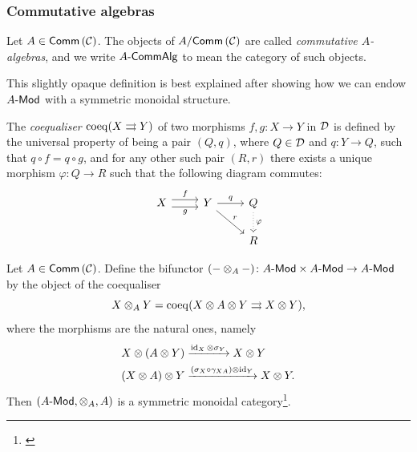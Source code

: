 

    \subsubsection{Commutative algebras} %
    \label{ssub:commutative_algebras}

        \begin{definition}
            Let $A\in\mathsf{Comm}\left({\mathcal{C}}\right)$.
            The objects of $A/\mathsf{Comm}\left({\mathcal{C}}\right)$ are called \emph{commutative $A$-algebras}, and we write ${{A}\hbox{-}\mathsf{CommAlg}}$ to mean the category of such objects.
        \end{definition}

        This slightly opaque definition is best explained after showing how we can endow ${{A}\hbox{-}\mathsf{Mod}}$ with a symmetric monoidal structure.

        \begin{definition}[Coequaliser]\label{df:coequaliser}
            The \emph{coequaliser $\operatorname{coeq}(X\rightrightarrows Y)$} of two morphisms $f,g\colon X\to Y$ in $\mathcal{D}$ is defined by the universal property of being a pair $(Q,q)$, where $Q\in\mathcal{D}$ and $q\colon Y\to Q$, such that $q\circ f=q\circ g$, and for any other such pair $(R,r)$ there exists a unique morphism $\varphi\colon Q\to R$ such that the following diagram commutes:
            \begin{equation*}
                \begin{tikzcd}
                    X \arrow[r, shift left=.75ex, "f"] \arrow[r, shift right=.75ex, swap, "g"] & Y \arrow[r, "q"] \arrow[dr, "r"] & Q \arrow[d, dotted, "\varphi"]\\
                     & & R
                \end{tikzcd}
            \end{equation*}
        \end{definition}
        \vspace{-3em}
        \begin{definition}\label{df:smc-on-a-mod}
            Let $A\in\mathsf{Comm}\left({\mathcal{C}}\right)$.
            Define the bifunctor $({-}\otimes_A{-})\colon{{A}\hbox{-}\mathsf{Mod}}\times{{A}\hbox{-}\mathsf{Mod}}\to{{A}\hbox{-}\mathsf{Mod}}$ by the object of the coequaliser
            \begin{equation*}
                X\otimes_A Y = \operatorname{coeq}(X\otimes A\otimes Y\rightrightarrows X\otimes Y),
            \end{equation*}
            where the morphisms are the natural ones, namely
            \begin{align*}
                X\otimes (A\otimes Y) &\xrightarrow{\operatorname{id}_X\otimes\sigma_Y} X\otimes Y\\
                (X\otimes A)\otimes Y &\xrightarrow{(\sigma_X\circ\gamma_{XA})\otimes\operatorname{id}_Y} X\otimes Y.
            \end{align*}
            Then $({{A}\hbox{-}\mathsf{Mod}},\otimes_A,A)$ is a symmetric monoidal category\footnote{
                \cite[Proposition~1.2.15,~\S1.2,~p.14]{Marty:2009tj}
            }.
        \end{definition}

